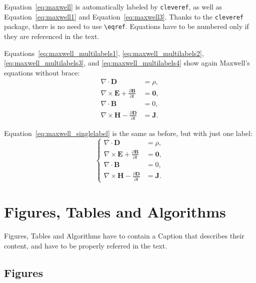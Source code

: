 \documentclass[11pt,a4paper]{article}
\begin{document}
Equation~\eqref{eq:maxwell} is automatically labeled by \texttt{cleveref},
as well as Equation~\eqref{eq:maxwell1} and Equation~\eqref{eq:maxwell3}.
Thanks to the \verb|cleveref| package, there is no need to use \verb|\eqref|.
Equations have to be numbered only if they are referenced in the text.

Equations~\eqref{eq:maxwell_multilabels1}, \eqref{eq:maxwell_multilabels2}, \eqref{eq:maxwell_multilabels3}, and \eqref{eq:maxwell_multilabels4} show again Maxwell's equations without brace:
\begin{align}
    \nabla\cdot \bm{D} & = \rho, \label{eq:maxwell_multilabels1} \\
    \nabla \times \bm{E} +  \frac{\partial \bm{B}}{\partial t} &= \bm{0}, \label{eq:maxwell_multilabels2} \\
    \nabla\cdot \bm{B} & = 0, \label{eq:maxwell_multilabels3} \\
    \nabla \times \bm{H} - \frac{\partial \bm{D}}{\partial t} &= \bm{J} \label{eq:maxwell_multilabels4}.
\end{align}

Equation~\eqref{eq:maxwell_singlelabel} is the same as before,
but with just one label:
\begin{equation}
    \label{eq:maxwell_singlelabel}
    \left\{
    \begin{aligned}
    \nabla\cdot \bm{D} & = \rho, \\
    \nabla \times \bm{E} +  \frac{\partial \bm{B}}{\partial t} &= \bm{0},\\
    \nabla\cdot \bm{B} & = 0, \\
    \nabla \times \bm{H} - \frac{\partial \bm{D}}{\partial t} &= \bm{J}.
    \end{aligned}
    \right.
\end{equation}

\section{Figures, Tables and Algorithms}

Figures, Tables and Algorithms have to contain a Caption that describes their content, and have to be properly referred in the text.

\subsection{Figures}
\label{subsec:figures}
\end{document}
